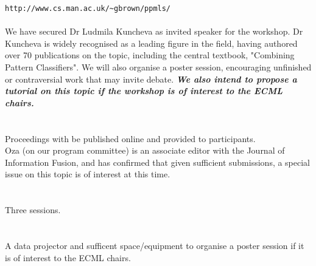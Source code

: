 \documentclass[a4]{article}
\begin{document}
{\tt http://www.cs.man.ac.uk/\~{}gbrown/ppmls/}\\
\\
We have secured Dr Ludmila Kuncheva as invited speaker for the workshop.  Dr Kuncheva is widely recognised
as a leading figure in the field, having authored over 70 publications on the topic,
including the central textbook, "Combining Pattern Classifiers".  We will also organise a poster session, 
encouraging unfinished or contraversial work that may invite debate. {\em \bf We also intend to propose
a tutorial on this topic if the workshop is of interest to the ECML chairs.}\\
\\
\\
Proceedings with be published online and provided to participants.\\
Oza (on our program committee) is an associate editor with the Journal of 
Information Fusion, and has confirmed that given sufficient submissions, a special issue on this topic is
of interest at this time.\\
\\
\\
Three sessions.\\
\\
\\
A data projector and sufficent space/equipment to organise a poster session if it is of interest to the ECML 
chairs.
\end{document}
